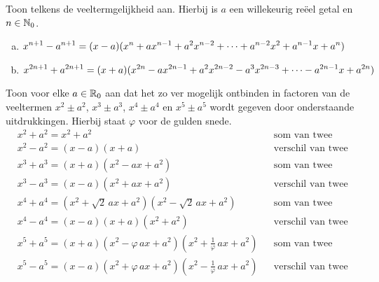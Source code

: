 \documentclass{ximera}
\begin{document}
\begin{Uitbreiding}
\begin{Oefening}
Toon telkens de veeltermgelijkheid aan. Hierbij is $a$ een willekeurig re\"eel getal en $n \in \mathbb{N}_0$.
\begin{enumerate}[(a)]
\item
$\displaystyle x^{n+1} - a^{n+1} = (x-a)(x^{n} + ax^{n-1} + a^2x^{n-2} + \dots + a^{n-2}x^2 + a^{n-1}x + a^{n})$
\item
$\displaystyle x^{2n+1} + a^{2n+1} = (x+a)(x^{2n} - ax^{2n-1} + a^2x^{2n-2} - a^3x^{2n-3} + \dots - a^{2n-1}x + a^{2n})$
\end{enumerate}
\end{Oefening}

\begin{Oefening}
\label{somtweevierdemachten}
Toon voor elke $a \in \mathbb{R}_0$ aan dat het zo ver mogelijk ontbinden in factoren van de veeltermen $x^2 \pm a^2$, $x^3 \pm a^3$, $x^4 \pm a^4$ en  $x^5 \pm a^5$ wordt gegeven door onderstaande uitdrukkingen. Hierbij staat $\varphi$ voor de gulden snede. %
\begin{align*}
& x^2 + a^2 = x^2 + a^2 && \text{som van twee kwadraten} \\
& x^2 - a^2 = (x-a)(x+a) && \text{verschil van twee kwadraten} \\
& x^3 + a^3 = (x+a)(x^2 - ax + a^2) && \text{som van twee derde machten} \\
& x^3 - a^3 = (x-a)(x^2 + ax + a^2) && \text{verschil van twee derde machten} \\
& x^4 + a^4 = (x^2 + \sqrt{2}\,ax + a^2)(x^2 - \sqrt{2}\,ax + a^2) && \text{som van twee vierde machten} \\
& x^4 - a^4 = (x-a)(x+a)(x^2+a^2) && \text{verschil van twee vierde machten} \\
& x^5 + a^5 = (x+a)(x^2-\varphi\,ax + a^2)(x^2+\frac{1}{\varphi}\,ax + a^2) && \text{som van twee vijfde machten} \\
& x^5 - a^5 = (x-a)(x^2+\varphi\,ax + a^2)(x^2-\frac{1}{\varphi}\,ax + a^2) && \text{verschil van twee vijfde machten}
\end{align*}
\end{Oefening}


\end{Uitbreiding}
\end{document}
